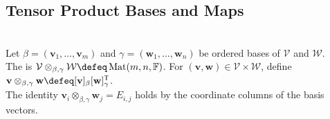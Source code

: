 \subsection{Tensor Product Bases and Maps}

\begin{definition} \label{def:finite-coordinate-tensor-product-model} \\
Let $\beta=(\mathbf{v}_1,\ldots,\mathbf{v}_m)$ and $\gamma=(\mathbf{w}_1,\ldots,\mathbf{w}_n)$ be ordered bases of $\mathcal{V}$ and $\mathcal{W}$.\\
The  is $\mathcal{V}\otimes_{\beta,\gamma}\mathcal{W}\defeq\operatorname{Mat}(m,n,\mathbb{F})$. For $(\mathbf{v},\mathbf{w})\in\mathcal{V}\times\mathcal{W}$, define $\mathbf{v}\otimes_{\beta,\gamma}\mathbf{w}\defeq[\mathbf{v}]_\beta[\mathbf{w}]_\gamma^{\mathsf{T}}$.\\
The identity $\mathbf{v}_i\otimes_{\beta,\gamma}\mathbf{w}_j=E_{i,j}$ holds by the coordinate columns of the basis vectors.
\end{definition}

